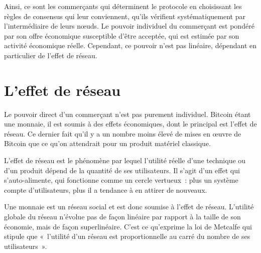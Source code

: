 Ainsi, ce sont les commerçants qui déterminent le protocole en choisissant les règles de consensus qui leur conviennent, qu'ils vérifient systématiquement par l'intermédiaire de leurs nœuds. Le pouvoir individuel du commerçant est pondéré par son offre économique susceptible d'être acceptée, qui est estimée par son activité économique réelle. Cependant, ce pouvoir n'est pas linéaire, dépendant en particulier de l'effet de réseau.


\section*{L'effet de réseau}

Le pouvoir direct d'un commerçant n'est pas purement individuel. Bitcoin étant une monnaie, il est soumis à des effets économiques, dont le principal est l'effet de réseau. Ce dernier fait qu'il y a un nombre moins élevé de mises en œuvre de Bitcoin que ce qu'on attendrait pour un produit matériel classique.


L'effet de réseau est le phénomène par lequel l'utilité réelle d'une technique ou d'un produit dépend de la quantité de ses utilisateurs. Il s'agit d'un effet qui s'auto-alimente, qui fonctionne comme un cercle vertueux~: plus un système compte d'utilisateurs, plus il a tendance à en attirer de nouveaux.

Une monnaie est un réseau social et est donc soumise à l'effet de réseau. L'utilité globale du réseau n'évolue pas de façon linéaire par rapport à la taille de son économie, mais de façon superlinéaire. C'est ce qu'exprime la loi de Metcalfe qui stipule que «~l'utilité d'un réseau est proportionnelle au carré du nombre de ses utilisateurs~».

